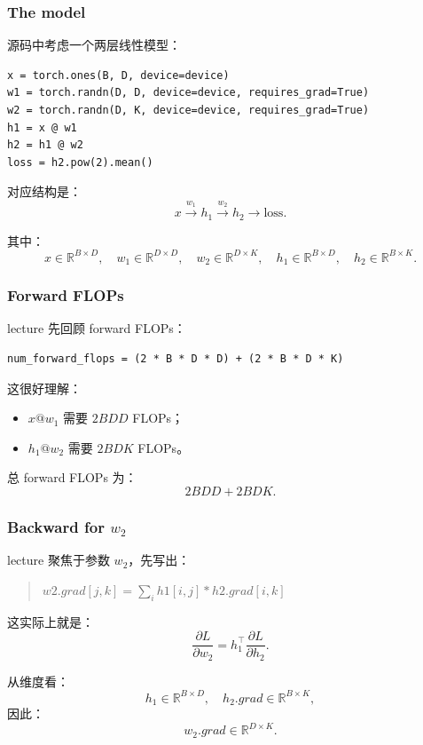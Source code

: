 \documentclass[a4paper,UTF8]{article}
\numberwithin{equation}{section}
\begin{document}
\subsubsection{The model}

源码中考虑一个两层线性模型：
\begin{verbatim}
x = torch.ones(B, D, device=device)
w1 = torch.randn(D, D, device=device, requires_grad=True)
w2 = torch.randn(D, K, device=device, requires_grad=True)
h1 = x @ w1
h2 = h1 @ w2
loss = h2.pow(2).mean()
\end{verbatim}

对应结构是：
\[
x \xrightarrow{w_1} h_1 \xrightarrow{w_2} h_2 \to \text{loss}.
\]

其中：
\[
x \in \mathbb{R}^{B \times D},\quad
w_1 \in \mathbb{R}^{D \times D},\quad
w_2 \in \mathbb{R}^{D \times K},\quad
h_1 \in \mathbb{R}^{B \times D},\quad
h_2 \in \mathbb{R}^{B \times K}.
\]

\subsubsection{Forward FLOPs}

lecture 先回顾 forward FLOPs：
\begin{verbatim}
num_forward_flops = (2 * B * D * D) + (2 * B * D * K)
\end{verbatim}

这很好理解：
\begin{itemize}
    \item \(x @ w_1\) 需要 \(2BDD\) FLOPs；
    \item \(h_1 @ w_2\) 需要 \(2BDK\) FLOPs。
\end{itemize}

总 forward FLOPs 为：
\[
2BDD + 2BDK.
\]

\subsubsection{Backward for \(w_2\)}

lecture 聚焦于参数 \(w_2\)，先写出：
\begin{quote}
\(w2.grad[j,k] = \sum_i h1[i,j] * h2.grad[i,k]\)
\end{quote}

这实际上就是：
\[
\frac{\partial L}{\partial w_2}
=
h_1^\top \frac{\partial L}{\partial h_2}.
\]

从维度看：
\[
h_1 \in \mathbb{R}^{B \times D},\quad
h_2.grad \in \mathbb{R}^{B \times K},
\]
因此：
\[
w_2.grad \in \mathbb{R}^{D \times K}.
\]
\end{document}
